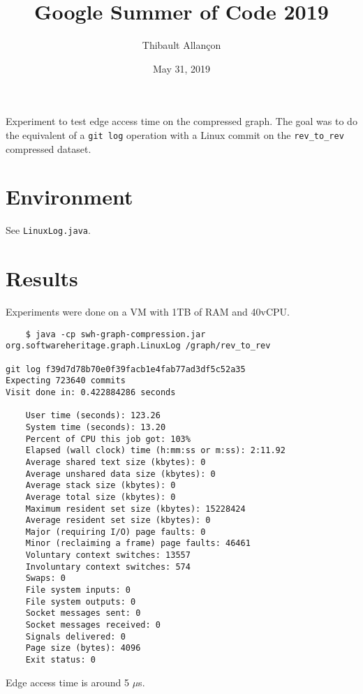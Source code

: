 \documentclass[11pt,a4paper]{article}
\title{Google Summer of Code 2019}
\author{Thibault Allançon}
\date{May 31, 2019}
\begin{document}
\maketitle

Experiment to test edge access time on the compressed graph. The goal was to do
the equivalent of a \texttt{git log} operation with a Linux commit on
the \texttt{rev_to_rev} compressed dataset.

\section{Environment}

See \texttt{LinuxLog.java}.

\section{Results}

Experiments were done on a VM with 1TB of RAM and 40vCPU.

\begin{small}
\begin{verbatim}
    $ java -cp swh-graph-compression.jar org.softwareheritage.graph.LinuxLog /graph/rev_to_rev

git log f39d7d78b70e0f39facb1e4fab77ad3df5c52a35
Expecting 723640 commits
Visit done in: 0.422884286 seconds

    User time (seconds): 123.26
    System time (seconds): 13.20
    Percent of CPU this job got: 103%
    Elapsed (wall clock) time (h:mm:ss or m:ss): 2:11.92
    Average shared text size (kbytes): 0
    Average unshared data size (kbytes): 0
    Average stack size (kbytes): 0
    Average total size (kbytes): 0
    Maximum resident set size (kbytes): 15228424
    Average resident set size (kbytes): 0
    Major (requiring I/O) page faults: 0
    Minor (reclaiming a frame) page faults: 46461
    Voluntary context switches: 13557
    Involuntary context switches: 574
    Swaps: 0
    File system inputs: 0
    File system outputs: 0
    Socket messages sent: 0
    Socket messages received: 0
    Signals delivered: 0
    Page size (bytes): 4096
    Exit status: 0
\end{verbatim}
\end{small}

Edge access time is around 5 $\mu$s.
\end{document}
